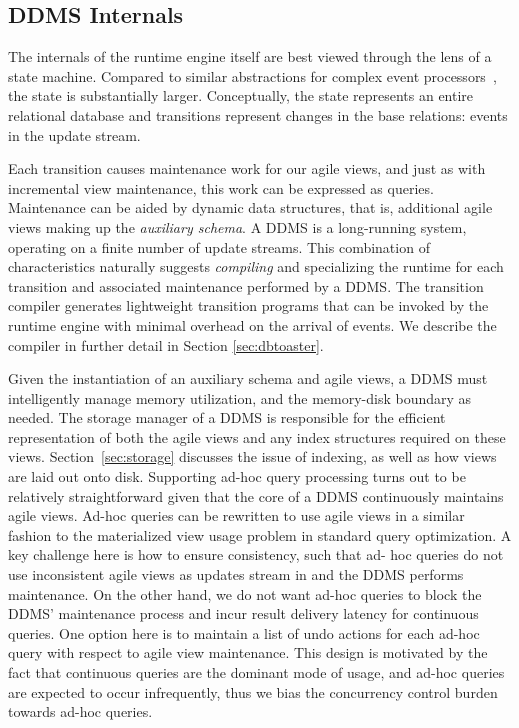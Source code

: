 \subsection{DDMS Internals}


The internals of the runtime engine itself are best viewed through the lens of a
state machine.  Compared to similar abstractions for complex event
processors~\cite{agrawal-sigmod:08, demers-sigmod:07}, the state is
substantially larger. Conceptually, the state represents an entire
relational database and transitions represent changes in the base
relations: events in the update stream.



Each transition causes maintenance work for our agile views, and just as
with incremental view maintenance, this work can be expressed as queries.
Maintenance can be aided by dynamic data structures, that is, additional agile
views making up the \textit{auxiliary schema}.
A DDMS is a long-running system, operating on a finite number of update streams.
This combination of characteristics naturally suggests \textit{compiling} and
specializing the runtime for each transition and associated maintenance
performed by a DDMS. The transition compiler generates lightweight transition
programs that can be invoked by the runtime engine with minimal overhead on the
arrival of events. We describe the compiler in further detail in Section
\ref{sec:dbtoaster}.




Given the instantiation of an auxiliary schema and agile views, a DDMS must
intelligently manage memory utilization, and the memory-disk boundary as needed. The
storage manager of a DDMS is responsible for the efficient representation of
both the agile views and any index structures required on these views.
Section~\ref{sec:storage} discusses the issue of indexing, as well as how views
are laid out onto disk. Supporting ad-hoc query processing turns out to be
relatively straightforward given that the core of a DDMS continuously maintains 
agile views. Ad-hoc queries can be rewritten to use agile views in a 
similar fashion to the materialized view usage problem in standard query 
optimization. A key challenge here is how to ensure consistency, such that ad-
hoc queries do not use inconsistent agile views as updates stream in and the 
DDMS performs maintenance. On the other hand, we do not want ad-hoc queries to 
block the DDMS' maintenance process and incur result delivery latency for 
continuous queries.
One option here is to maintain a list of undo actions for each ad-hoc query with
respect to agile view maintenance. This design is motivated by the fact that
continuous queries are the dominant mode of usage, and ad-hoc queries are
expected to occur infrequently, thus we bias the concurrency control burden
towards ad-hoc queries.





